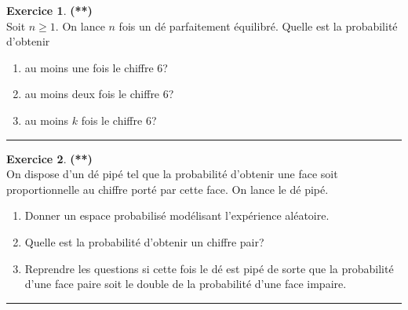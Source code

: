 \documentclass[a4paper,11pt]{article}
\theoremstyle{definition}
\newtheorem{exo}{Exercice} %
\begin{document}
\begin{minipage}{1\linewidth}
\begin{minipage}[c]{0.48\linewidth}
\begin{exo}\textbf{(**)}\quad\\[0.2cm]
Soit $n\geq 1$. On lance $n$ fois un dé parfaitement équilibré. Quelle est la probabilité d'obtenir
\begin{enumerate}
	\item au moins une fois le chiffre 6?
	\item au moins deux fois le chiffre 6?
	\item au moins $k$ fois le chiffre 6?
\end{enumerate}

\centering\rule{1\linewidth}{0.6pt}\end{exo}


\begin{exo}\textbf{(**)}\quad\\[0.2cm]
On dispose d'un dé pipé tel que la probabilité d'obtenir une face soit proportionnelle au chiffre porté par cette face. On lance le dé pipé. 
\begin{enumerate}
	\item Donner un espace probabilisé modélisant l'expérience aléatoire.
	\item Quelle est la probabilité d'obtenir un chiffre pair?
	\item Reprendre les questions si cette fois le dé est pipé de sorte que la probabilité d'une face paire soit le double de la probabilité d'une face impaire.
\end{enumerate}

\centering\rule{1\linewidth}{0.6pt}\end{exo}


\end{minipage}\end{minipage} \newpage
\end{document}
